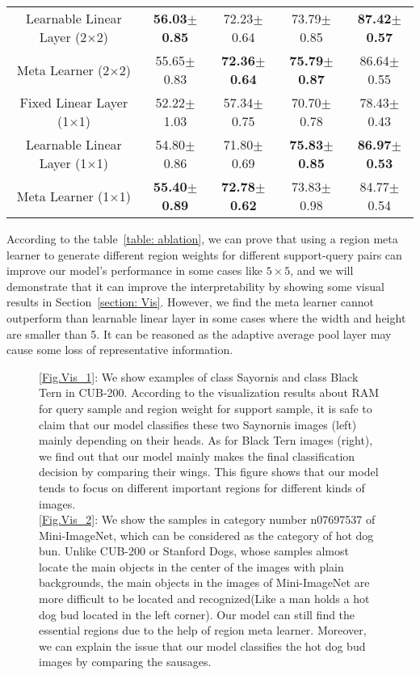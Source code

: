 \documentclass[letterpaper]{article}
\begin{document}
\begin{table}[h]
\begin{center}
\begin{tabular}{c c c c c}
  Learnable Linear Layer (2$\times$2) & \textbf{56.03$\pm$0.85} & 72.23$\pm$0.64 & 73.79$\pm$0.85 & \textbf{87.42$\pm$0.57}  \\
  Meta Learner (2$\times$2)& 55.65$\pm$0.83 & \textbf{72.36$\pm$0.64} & \textbf{75.79$\pm$0.87} &  86.64$\pm$0.55\\
  \hline
  Fixed Linear Layer (1$\times$1)& 52.22$\pm$1.03 & 57.34$\pm$0.75 & 70.70$\pm$0.78 & 78.43$\pm$0.43 \\
  Learnable Linear Layer (1$\times$1) & 54.80$\pm$0.86  & 71.80$\pm$0.69  & \textbf{75.83$\pm$0.85} &  \textbf{86.97$\pm$0.53}  \\
  Meta Learner (1$\times$1)& \textbf{55.40$\pm$0.89} &\textbf{72.78$\pm$0.62}  & 73.83$\pm$0.98 & 84.77$\pm$0.54 \\
  \hline
\end{tabular}
\end{center}
\end{table}

According to the table~\ref{table: ablation}, we can prove that using a region meta learner to generate different region weights for different support-query pairs can improve our model's performance in some cases like $5\times5$, and we will demonstrate that it can improve the interpretability by showing some visual results in Section~\ref{section: Vis}. However, we find the meta learner cannot outperform than learnable linear layer in some cases where the width and height are smaller than 5. It can be reasoned as the adaptive average pool layer may cause some loss of representative information. 

\begin{figure}
\centering 
{}
\caption{\ref{Fig.Vis_1}: 
We show examples of class Sayornis and class Black Tern in CUB-200. According to the visualization results about RAM for query sample and region weight for support sample, it is safe to claim that our model classifies these two Saynornis images (left) mainly depending on their heads. As for Black Tern images (right), we find out that our model mainly makes the final classification decision by comparing their wings. This figure shows that our model tends to focus on different important regions for different kinds of images.\\        
\ref{Fig.Vis_2}: 
We show the samples in category number n07697537 of Mini-ImageNet, which can be considered as the category of hot dog bun. Unlike CUB-200 or Stanford Dogs, whose samples almost locate the main objects in the center of the images with plain backgrounds, the main objects in the images of Mini-ImageNet are more difficult to be located and recognized(Like a man holds a hot dog bud located in the left corner). Our model can still find the essential regions due to the help of region meta learner. Moreover, we can explain the issue that our model classifies the hot dog bud images by comparing the sausages.}
\label{fig:visualization}
\end{figure}
\end{document}
